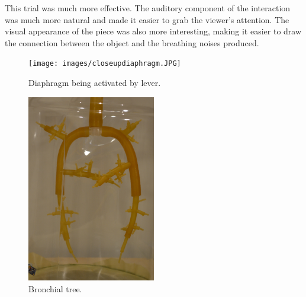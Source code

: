 \documentclass[letterpaper]{article}
\begin{document}
This trial was much more effective. The auditory component of the interaction was much more natural and made it easier to grab the viewer's attention. The visual appearance of the piece was also more interesting, making it easier to draw the connection between the object and the breathing noises produced. 

\begin{figure}[h]
\texttt{[image: images/closeupdiaphragm.JPG]}
\caption{Diaphragm being activated by lever.}
  \label{fig:denki}
\end{figure}

\begin{figure}[h]
\includegraphics[width=0.5\textwidth]{images/closeupbronchialtree.JPG}
\caption{Bronchial tree.}
\end{figure}

\end{document}
